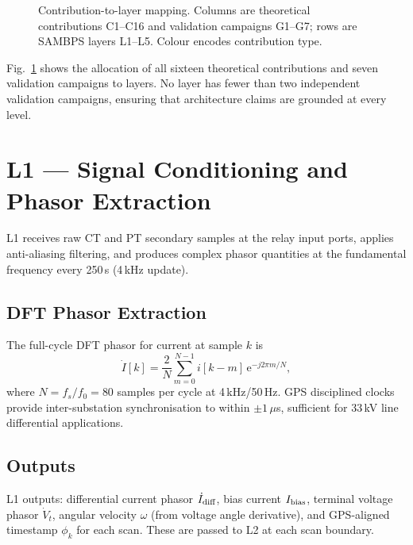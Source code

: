 \documentclass[journal,twoside,10pt]{IEEEtran}
\begin{document}
\begin{figure}[!t]
\centering
\resizebox{\columnwidth}{!}{%
%
}
\caption{Contribution-to-layer mapping.  Columns are theoretical
  contributions C1--C16 and validation campaigns G1--G7; rows are
  SAMBPS layers L1--L5.  Colour encodes contribution type.}
\label{fig:contribution_map}
\end{figure}

Fig.~\ref{fig:contribution_map} shows the allocation of all sixteen
theoretical contributions and seven validation campaigns to layers.
No layer has fewer than two independent validation campaigns, ensuring
that architecture claims are grounded at every level.

\section{L1 — Signal Conditioning and Phasor Extraction}
\label{sec:L1}

L1 receives raw CT and PT secondary samples at the relay input ports,
applies anti-aliasing filtering, and produces complex phasor quantities
at the fundamental frequency every 250\,\textmu s (4\,kHz update).

\subsection{DFT Phasor Extraction}

The full-cycle DFT phasor for current at sample $k$ is
\[
  \dot{I}[k] = \frac{2}{N}\sum_{m=0}^{N-1}
    i[k-m]\,\mathrm{e}^{-j2\pi m/N},
\]
where $N = f_s/f_0 = 80$ samples per cycle at 4\,kHz/50\,Hz.
GPS disciplined clocks provide inter-substation synchronisation to
within $\pm 1\,\mu$s, sufficient for 33\,kV line differential
applications.

\subsection{Outputs}

L1 outputs: differential current phasor $\dot{I}_{\rm diff}$, bias
current $I_{\rm bias}$, terminal voltage phasor $\dot{V}_t$,
angular velocity $\omega$ (from voltage angle derivative), and
GPS-aligned timestamp $\phi_k$ for each scan.  These are passed to
L2 at each scan boundary.

\end{document}
